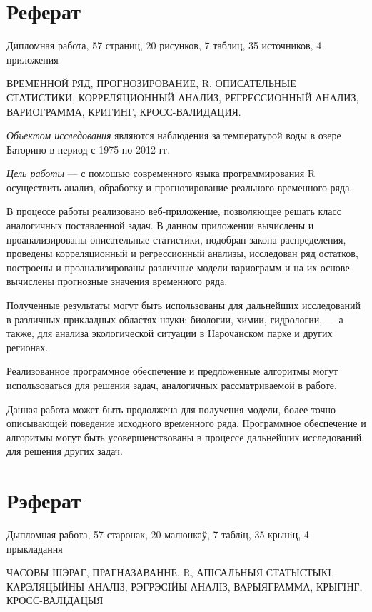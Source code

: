 \newpage

\chapter*{Реферат}
Дипломная работа, 57 страниц, 20 рисунков, 7 таблиц, 35 источников, 4 приложения

ВРЕМЕННОЙ РЯД, ПРОГНОЗИРОВАНИЕ, R, ОПИСАТЕЛЬНЫЕ СТАТИСТИКИ, КОРРЕЛЯЦИОННЫЙ АНАЛИЗ, РЕГРЕССИОННЫЙ АНАЛИЗ, ВАРИОГРАММА, КРИГИНГ, КРОСС-ВАЛИДАЦИЯ.

\textit{Объектом исследования} являются наблюдения за температурой воды в озере Баторино в период с 1975 по 2012 гг.

\textit{Цель работы} --- с помошью современного языка программирования R осуществить анализ, обработку и прогнозирование реального временного ряда.

В процессе работы реализовано веб-приложение, позволяющее решать класс аналогичных поставленной задач. В данном приложении вычислены и проанализированы описательные статистики, подобран закона распределения, проведены корреляционный и регрессионный анализы, исследован ряд остатков, построены и проанализированы различные модели вариограмм и на их основе вычислены прогнозные значения временного ряда.

Полученные результаты могут быть использованы для дальнейших исследований в различных прикладных областях науки: биологии, химии, гидрологии, --- а также, для анализа экологической ситуации в Нарочанском парке и других регионах.

Реализованное программное обеспечение и предложенные алгоритмы могут использоваться для решения задач, аналогичных рассматриваемой в работе.

Данная работа может быть продолжена для получения модели, более точно описывающей поведение исходного временного ряда. Программное обеспечение и алгоритмы могут быть усовершенствованы в процессе дальнейших исследований, для решения других задач.

\newpage

\chapter*{Рэферат}
Дыпломная работа, 57 старонак, 20 малюнкаў, 7 таблiц, 35 крынiц, 4 прыкладання

ЧАСОВЫ ШЭРАГ, ПРАГНАЗАВАННЕ, R, АПІСАЛЬНЫЯ СТАТЫСТЫКI, КАРЭЛЯЦЫЙНЫ АНАЛIЗ, РЭГРЭСIЙЫ АНАЛIЗ, ВАРЫЯГРАММА, КРЫГIНГ, КРОСС-ВАЛIДАЦЫЯ

